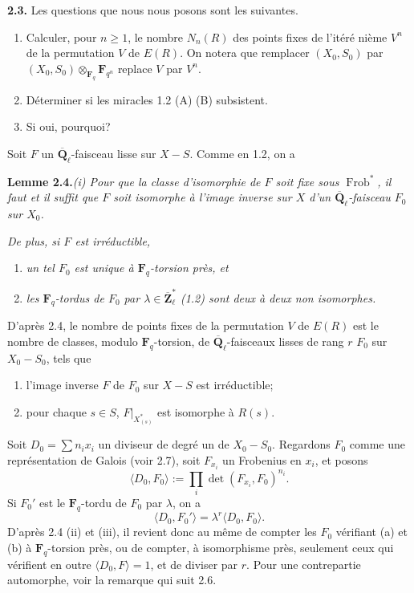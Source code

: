 \documentclass[11pt]{article}
\newcommand{\Fq}{\mathbf{F}_q}
\newcommand{\Fqn}{\mathbf{F}_{q^n}}
\newcommand{\Qbl}{\overline{\mathbf{Q}}_{\ell}}
\newcommand{\Zbl}{\overline{\mathbf{Z}}_{\ell}}
\newcommand{\Frob}{\operatorname{Frob}}
\newcommand{\para}[1]{\medskip\noindent\textbf{#1}\enspace}
\begin{document}
\para{2.3.} Les questions que nous nous posons sont les suivantes.
\begin{enumerate}[label=(\roman*),leftmargin=2.2em]
\item Calculer, pour \(n\ge 1\), le nombre \(N_n(R)\) des points fixes de l'itéré nième \(V^n\) de la permutation \(V\) de \(E(R)\). On notera que remplacer \((X_0,S_0)\) par \((X_0,S_0)\otimes_{\Fq}\Fqn\) replace \(V\) par \(V^n\).
\item Déterminer si les miracles 1.2 (A) (B) subsistent.
\item Si oui, pourquoi?
\end{enumerate}

Soit \(F\) un \(\Qbl\)-faisceau lisse sur \(X-S\). Comme en 1.2, on a

\medskip
\noindent\textbf{Lemme 2.4.}\quad\textit{(i) Pour que la classe d'isomorphie de \(F\) soit fixe sous \(\Frob^*\), il faut et il suffit que \(F\) soit isomorphe à l'image inverse sur \(X\) d'un \(\Qbl\)-faisceau \(F_0\) sur \(X_0\).}

\noindent\textit{De plus, si \(F\) est irréductible,}
\begin{enumerate}[label=(\roman*),leftmargin=2.2em,start=2]
\item \textit{un tel \(F_0\) est unique à \(\Fq\)-torsion près, et}
\item \textit{les \(\Fq\)-tordus de \(F_0\) par \(\lambda\in\Zbl^*\) (1.2) sont deux à deux non isomorphes.}
\end{enumerate}

D'après 2.4, le nombre de points fixes de la permutation \(V\) de \(E(R)\) est le nombre de classes, modulo \(\Fq\)-torsion, de \(\Qbl\)-faisceaux lisses de rang \(r\) \(F_0\) sur \(X_0-S_0\), tels que
\begin{enumerate}[label=(\alph*),leftmargin=2.2em]
\item l'image inverse \(F\) de \(F_0\) sur \(X-S\) est irréductible;
\item pour chaque \(s\in S\), \(F|_{X_{(s)}^*}\) est isomorphe à \(R(s)\).
\end{enumerate}
Soit \(D_0=\sum n_i x_i\) un diviseur de degré un de \(X_0-S_0\). Regardons \(F_0\) comme une représentation de Galois (voir 2.7), soit \(F_{x_i}\) un Frobenius en \(x_i\), et posons
\[
\langle D_0,F_0\rangle:=\prod_i \det(F_{x_i},F_0)^{n_i}.
\]
Si \(F_0'\) est le \(\Fq\)-tordu de \(F_0\) par \(\lambda\), on a
\[
\langle D_0,F_0'\rangle=\lambda^r\langle D_0,F_0\rangle.
\]
D'après 2.4 (ii) et (iii), il revient donc au même de compter les \(F_0\) vérifiant (a) et (b) à \(\Fq\)-torsion près, ou de compter, à isomorphisme près, seulement ceux qui vérifient en outre \(\langle D_0,F\rangle=1\), et de diviser par \(r\). Pour une contrepartie automorphe, voir la remarque qui suit 2.6.
\end{document}

